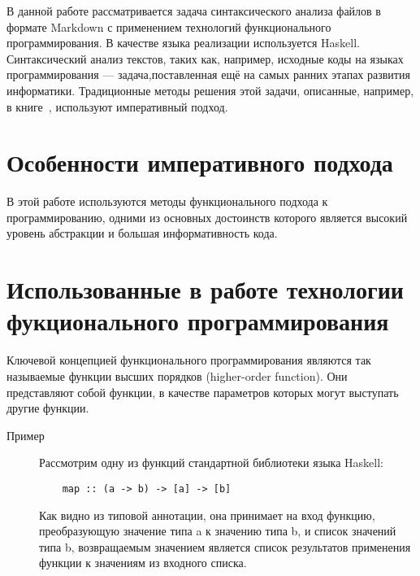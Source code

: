 



\newcommand\todo[1]{\textcolor{red}{#1}} 

\newcommand\sep{\rule{4cm}{0.4pt}}



\Intro
В данной работе рассматривается задача синтаксического анализа
файлов в формате Markdown с применением технологий функционального
программирования. В качестве языка реализации используется Haskell.
Синтаксический анализ текстов, таких как, например, исходные коды на языках программирования --- задача,поставленная ещё на самых ранних этапах развития информатики. Традиционные методы решения этой задачи, описанные, например, в книге~\autocite{DragonBook2}, используют императивный подход. 

\section{Особенности императивного подхода}

В этой работе используются методы функционального подхода к программированию, одними из основных достоинств которого является высокий уровень абстракции и большая информативность кода.

\section{Использованные в работе технологии фукционального программирования}

Ключевой концепцией функционального программирования являются так называемые функции высших порядков (higher-order function). Они представляют собой функции, в качестве параметров которых могут выступать другие функции. 

\begin{description}
  \item[Пример] 
  Рассмотрим одну из функций стандартной библиотеки языка Haskell: 
  \begin{lstlisting}
    map :: (a -> b) -> [a] -> [b]
  \end{lstlisting}
  Как видно из типовой аннотации, она принимает на вход функцию, преобразующую значение типа a к значению типа b, и список значений типа b, возвращаемым значением является список результатов применения функции к значениям из входного списка.   
\end{description}

